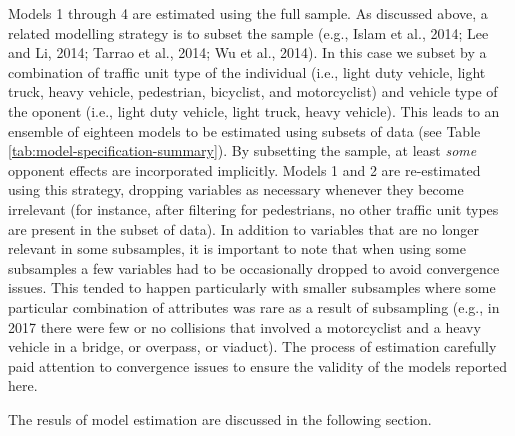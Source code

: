 \documentclass[]{elsarticle} %
\begin{document}
Models 1 through 4 are estimated using the full sample. As discussed
above, a related modelling strategy is to subset the sample (e.g., Islam
et al., 2014; Lee and Li, 2014; Tarrao et al., 2014; Wu et al., 2014).
In this case we subset by a combination of traffic unit type of the
individual (i.e., light duty vehicle, light truck, heavy vehicle,
pedestrian, bicyclist, and motorcyclist) and vehicle type of the oponent
(i.e., light duty vehicle, light truck, heavy vehicle). This leads to an
ensemble of eighteen models to be estimated using subsets of data (see
Table \ref{tab:model-specification-summary}). By subsetting the sample,
at least \emph{some} opponent effects are incorporated implicitly.
Models 1 and 2 are re-estimated using this strategy, dropping variables
as necessary whenever they become irrelevant (for instance, after
filtering for pedestrians, no other traffic unit types are present in
the subset of data). In addition to variables that are no longer
relevant in some subsamples, it is important to note that when using
some subsamples a few variables had to be occasionally dropped to avoid
convergence issues. This tended to happen particularly with smaller
subsamples where some particular combination of attributes was rare as a
result of subsampling (e.g., in 2017 there were few or no collisions
that involved a motorcyclist and a heavy vehicle in a bridge, or
overpass, or viaduct). The process of estimation carefully paid
attention to convergence issues to ensure the validity of the models
reported here.

The resuls of model estimation are discussed in the following section.
\end{document}
